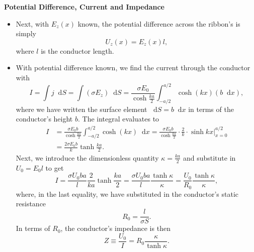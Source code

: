 \documentclass[11pt, a4paper]{article}
\newcommand{\diff}{\mathop{}\!\mathrm{d}} %
\begin{document}
\textbf{Potential Difference, Current and Impedance}
\begin{itemize}
	
	\item Next, with $ E_{z}(x) $ known, the potential difference across the ribbon's is simply
	\begin{equation*}
		U_{z}(x) = E_{z}(x) l,
	\end{equation*}
	where $ l $ is the conductor length. 
	
	\item With potential difference known, we find the current through the conductor with
	\begin{equation*}
		I = \int j \diff S = \int (\sigma E_{z}) \diff S = \frac{\sigma E_{0}}{\cosh \frac{ka}{2}} \int_{-a/2}^{a/2} \cosh(kx) (b \diff x),
	\end{equation*}
	where we have written the surface element $ \diff S = b \diff x $ in terms of the conductor's height $ b $. The integral evaluates to
	\begin{align*}
		I &= \frac{\sigma E_{0} b}{\cosh \frac{ka}{2}} \int_{-a/2}^{a/2} \cosh(kx) \diff x =  \frac{\sigma E_{0} b}{\cosh \frac{ka}{2}}  \cdot \frac{2}{k} \cdot \sinh kx \Big |_{x = 0}^{a/2} \\
		& =  \frac{2\sigma E_{0} b}{k} \tanh \frac{ka}{2}.
	\end{align*} 
	Next, we introduce the dimensionless quantity $ \kappa = \frac{ka}{2} $ and substitute in $ U_{0} = E_{0} l$ to get
	\begin{equation*}
		I = \frac{\sigma U_{0} b a}{l} \frac{2}{ka}\tanh \frac{ka}{2} = \frac{\sigma U_{0} b a}{l} \frac{\tanh \kappa}{\kappa} = \frac{U_{0}}{R_{0}} \frac{\tanh \kappa}{\kappa},
	\end{equation*}
	where, in the last equality, we have substituted in the conductor's static resistance
	\begin{equation*}
		R_{0} = \frac{l}{\sigma S}.
	\end{equation*}
	In terms of $ R_{0} $, the conductor's impedance is then
	\begin{equation*}
		Z \equiv \frac{U_{0}}{I} = R_{0}\frac{\kappa}{\tanh \kappa}.
	\end{equation*}
\end{itemize}	
\end{document}
